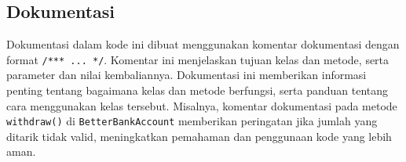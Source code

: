 \subsection{Dokumentasi}

Dokumentasi dalam kode ini dibuat menggunakan komentar dokumentasi dengan format \texttt{/*** ... */}. Komentar ini menjelaskan tujuan kelas dan metode, serta parameter dan nilai kembaliannya. Dokumentasi ini memberikan informasi penting tentang bagaimana kelas dan metode berfungsi, serta panduan tentang cara menggunakan kelas tersebut. Misalnya, komentar dokumentasi pada metode \texttt{withdraw()} di \texttt{BetterBankAccount} memberikan peringatan jika jumlah yang ditarik tidak valid, meningkatkan pemahaman dan penggunaan kode yang lebih aman.
